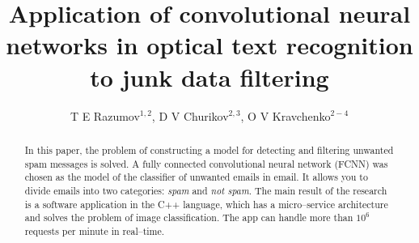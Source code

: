 \documentclass[a4paper]{jpconf}
\begin{document}
\title{Application of convolutional neural networks in optical text recognition to junk data filtering}
\author{\normalsize T E Razumov$^{1,2}$, D V Churikov$^{2,3}$, O V Kravchenko$^{2-4}$}

\address{
$^1$\,Mail.ru Group, Leningradsky pr., 39--79, Moscow, 125167, Russian Federation\\
$^2$\,Scientific and Technological Centre of Unique Instrumentation, Butlerova str., 15, Moscow, 117342, Russian Federation\\
$^3$\,Kotel'nikov Institute of Radio Engineering and Electronics of RAS, Mokhovaya st. 11--7,
Moscow, 125009, Russian Federation\\
$^4$\,Federal Research Center ``Computer Science and Control'' of RAS, Vavilova st., 40, Moscow, 119333, Russian Federation
}


{\fontsize{12}{18} \selectfont 
\begin{abstract}
In this paper, the problem of constructing a model for detecting and filtering unwanted spam messages is solved. A fully connected convolutional neural network ({FCNN}) was chosen as the model of the classifier of unwanted emails in email. It allows you to divide emails into two categories: \emph{spam} and \emph{not spam}.
The main result of the research is a software application in the C++ language, which has a micro--service architecture and solves the problem of image classification. The app can handle more than $10^6$ requests per minute in real--time.
\end{abstract}
}


\end{document}
